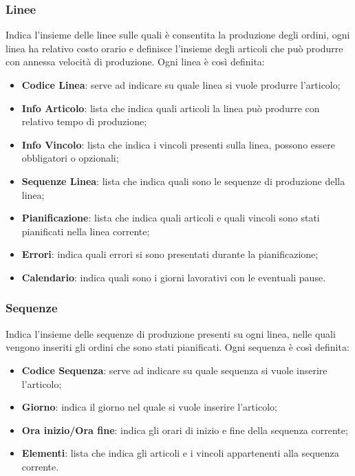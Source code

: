 \subsubsection{Linee}
Indica l'insieme delle linee sulle quali è consentita la produzione degli ordini, ogni linea ha relativo costo orario e definisce l'insieme degli articoli che può produrre con annessa velocità di produzione.
Ogni linea è così definita:
\begin{itemize}
	\item \textbf{Codice Linea}: serve ad indicare su quale linea si vuole produrre l'articolo;
	\item \textbf{Info Articolo}: lista che indica quali articoli la linea può produrre con relativo tempo di produzione;
	\item \textbf{Info Vincolo}: lista che indica i vincoli presenti sulla linea, possono essere obbligatori o opzionali;
	
	\item \textbf{Sequenze Linea}: lista che indica quali sono le sequenze di produzione della linea;
	
	\item \textbf{Pianificazione}: lista che indica quali articoli e quali vincoli sono stati pianificati nella linea corrente;
	
	
	\item \textbf{Errori}: indica quali errori si sono presentati durante la pianificazione;
	
	\item \textbf{Calendario}: indica quali sono i giorni lavorativi con le eventuali pause.
	
\end{itemize}

\subsubsection{Sequenze}
Indica l'insieme delle sequenze di produzione presenti su ogni linea, nelle quali vengono inseriti gli ordini che sono stati pianificati.
Ogni sequenza è così definita:
\begin{itemize}
	\item \textbf{Codice Sequenza}: serve ad indicare su quale sequenza si vuole inserire l'articolo;
	\item \textbf{Giorno}: indica il giorno nel quale si vuole inserire l'articolo;
	\item \textbf{Ora inizio/Ora fine}: indica gli orari di inizio e fine della sequenza corrente;
	
	\item \textbf{Elementi}: lista che indica gli articoli e i vincoli appartenenti alla sequenza corrente.
	
\end{itemize}

